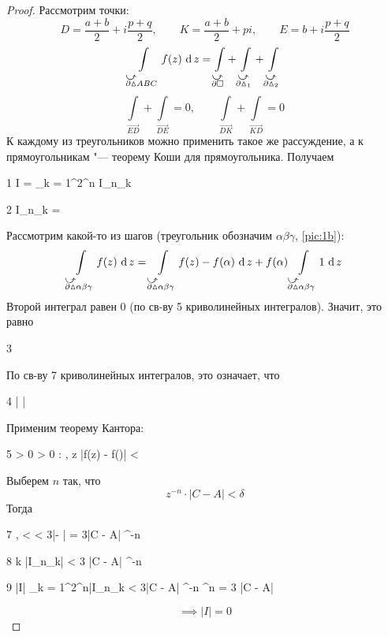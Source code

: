 \begin{proof}
	Рассмотрим точки:
	$$ D = \frac{a + b}2 + i \frac{p + q}2, \qquad K = \frac{a + b}2 + pi, \qquad E = b + i \frac{p + q}2 $$
	$$ \cint[z]{\curvedir{\partial \vartriangle} ABC}{f(z)} = \int\limits_{\curvedir{\partial \Box}} + \int\limits_{\curvedir{\partial \vartriangle_1}} + \int\limits_{\curvedir{\partial \vartriangle_2}} $$
	$$ \int\limits_{\overrightarrow{ED}} + \int\limits_{\overrightarrow{DE}} = 0, \qquad \int\limits_{\overrightarrow{DK}} + \int\limits_{\overrightarrow{KD}} = 0 $$
	К каждому из треугольников можно применить такое же рассуждение, а к прямоугольникам "--- теорему Коши для прямоугольника. Получаем
	\begin{equ}1
		I = \sum_{k = 1}^{2^n} I_{n_k}
	\end{equ}
	\begin{equ}2
		I_{n_k} = \cint[z]{\curvedir{\partial \vartriangle_{n_k}}}{f(z)}
	\end{equ}
	Рассмотрим какой-то из шагов (треугольник обозначим $ \alpha\beta\gamma $, \autoref{pic:1b}):
	$$ \cint[z]{\curvedir{\partial \vartriangle}\alpha\beta\gamma}{f(z)} = \cint[z]{\curvedir{\partial\vartriangle}\alpha\beta\gamma}{f(z) - f(\alpha)} + f(\alpha) \cint[z]{\curvedir{\partial\vartriangle}\alpha\beta\gamma}1 $$
	Второй интеграл равен 0 (по св-ву 5 криволинейных интегралов). Значит, это равно
	\begin{equ}3
		\cint[z]{\curvedir{\partial\vartriangle}\alpha\beta\gamma}{f(z) - f(\alpha)}
	\end{equ}
	По св-ву 7 криволинейных интегралов, это означает, что
	\begin{equ}4
		\bigg|  \bigg| \le \acint{\partial\vartriangle\alpha\beta\gamma}{|f(z) - f(\alpha)|}
	\end{equ}
	Применим теорему Кантора:
	\begin{equ}5
		\forall \veps > 0 \quad \exist \delta > 0 : \quad \forall \alpha \in [A, C], \quad z \in \partial \vartriangle \alpha\beta\gamma \quad |f(z) - f(\alpha)| < \veps
	\end{equ}
	Выберем $ n $ так, что
	$$ z^{-n} \cdot |C - A| < \delta $$
	Тогда
	\begin{equ}7
		,  \implies {} < \veps \acint{\partial\vartriangle\alpha\beta\gamma}{} < 3\veps |\gamma - \alpha| = 3\veps \cdot |C - A| ^{-n}
	\end{equ}
	\begin{equ}8
		 \forall k \quad |I_{n_k}| < 3 \veps |C - A| ^{-n}
	\end{equ}
	\begin{equ}9
		 |I| \le \sum_{k = 1}^{2^n}|I_{n_k} < 3\veps |C - A| ^{-n} ^n = 3 \veps |C - A|
	\end{equ}
	$$ \implies |I| = 0 $$
\end{proof}

